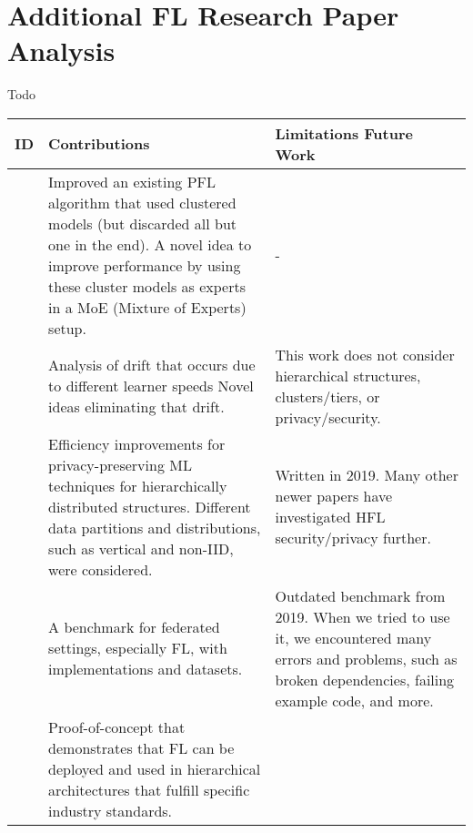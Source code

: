 \appendix
\appendixpage
\addappheadtotoc

\chapter{Additional FL Research Paper Analysis}\label{appendix:data-collection}
Todo

\begin{changemargin}{-2cm}{0cm} 
    \begin{tabular}{|c||m{0.4\paperwidth}|m{0.4\paperwidth}|}
        \hline
            ID & Contributions & Limitations Future Work \\
        \hline
            \cite{paper:adaptive_exper_models_for_pfl}
            &
            Improved an existing PFL algorithm that used clustered models (but discarded all but one in the end).
            A novel idea to improve performance by using these cluster models as experts in a MoE (Mixture of Experts) setup.
            &
            -
        \\
        \hline
            \cite{paper:tackling_objective_inconsistency_problem_in_heterogeneous_fl}
            &
            Analysis of drift that occurs due to different learner speeds
            Novel ideas eliminating that drift.
            &
            This work does not consider hierarchical structures, clusters/tiers, or privacy/security.
        \\
        \hline
            \cite{paper:efficient_privacy_preserving_ml_in_hierarchical_distributed_systems}
            &
            Efficiency improvements for privacy-preserving ML techniques for hierarchically distributed structures.
            Different data partitions and distributions, such as vertical and non-IID, were considered.
            &
            Written in 2019.
            Many other newer papers have investigated HFL security/privacy further.
        \\
        \hline
            \cite{paper:leaf_fl_benchmark}
            &
            A benchmark for federated settings, especially FL, with implementations and datasets.
            &
            Outdated benchmark from 2019.
            When we tried to use it, we encountered many errors and problems, such as broken dependencies, failing example code, and more.
        \\
        \hline
            \cite{paper:deploying_fl_in_hierarchical_edge_architecture}
            &
            Proof-of-concept that demonstrates that FL can be deployed and used in hierarchical architectures that fulfill specific industry standards.

\end{tabular}
\end{changemargin}
